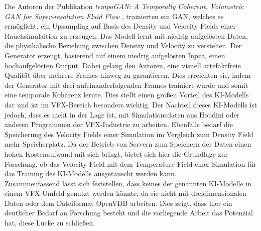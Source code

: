 Die Autoren der Publikation \textit{tempoGAN: A Temporally Coherent, Volumetric GAN for Super-resolution Fluid Flow \parencite{xie2018tempoGAN}}, trainierten ein GAN, welches es ermöglicht, ein Upsampling auf Basis des Density und Velocity Fields einer Rauchsimulaition zu erzeugen. Das Modell lernt mit niedrig aufgelösten Daten, die physikalische Beziehung zwischen Density und Velocity zu verstehen. Der Generator erzeugt, basierend auf einem niedrig aufgelösten Input, einen hochaufgelösten Output. Dabei gelang den Autoren, eine visuell artefaktfreie Qualität über mehrere Frames hinweg zu garantieren. Dies erreichten sie, indem der Generator mit drei aufeinanderfolgenden Frames trainiert wurde und somit eine temporale Kohärenz lernte. Dies stellt einen großen Vorteil des KI-Modells dar und ist im VFX-Bereich besonders wichtig. Der Nachteil dieses KI-Modells ist jedoch, dass es nicht in der Lage ist, mit Simulationsdaten aus Houdini oder anderen Programmen der VFX-Industrie zu arbeiten. Ebenfalls bedarf die Speicherung des Velocity Fields einer Simulation im Vergleich zum Density Field mehr Speicherplatz. Da der Betrieb von Servern zum Speichern der Daten einen hohen Kostenaufwand mit sich bringt, bietet sich hier die Grundlage zur Forschung, ob das Velocity Field mit dem Temperature Field einer Simulation für das Training des KI-Modells ausgetauscht werden kann. \\

Zusammenfassend lässt sich feststellen, dass keines der genannten KI-Modelle in einem VFX-Umfeld genutzt werden könnte, da sie nicht mit dreidimensionalen Daten oder dem Dateiformat OpenVDB arbeiten. Dies zeigt, dass hier ein deutlicher Bedarf an Forschung besteht und die vorliegende Arbeit das Potenzial hat, diese Lücke zu schließen.

